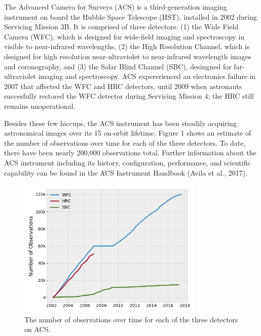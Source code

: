 \documentclass[10pt,journal,compsoc]{IEEEtran}
\begin{document}
The Advanced Camera for Surveys (ACS) is a third-generation imaging
instrument on board the Hubble Space Telescope (HST), installed in 2002 during
Servicing Mission 3B. It is comprised of three detectors: (1) the Wide Field Camera
(WFC), which is designed for wide-field imaging and spectroscopy in visible to
near-infrared wavelengths, (2) the High Resolution Channel, which is designed for
high resolution near-ultraviolet to near-infrared wavelength images and coronography,
and (3) the Solar Blind Channel (SBC), desingned for far-ultraviolet imaging and
spectroscopy.  ACS expererienced an electronics failure in 2007 that affected
the WFC and HRC detectors, until 2009 when astronauts succesfully restored the WFC
detector during Servicing Mission 4; the HRC still remains unoperational.

Besides these few hiccups, the ACS instrument has been steadily acquiring astronomical
images over its 15 on-orbit lifetime.  Figure 1 shows an estimate of the number of
observations over time for each of the three detectors.  To date, there have been
nearly 200,000 observations total.  Further information about the ACS instrument
including its history, configuration, performance, and scientific capability can be
found in the ACS Instrument Handbook (Avila et al., 2017).

\begin{figure}[!t]
\centering
\includegraphics[width=3.5in]{./figures/num_obs.png}
\caption{The number of observations over time for each of the three detectors on ACS.}
\label{fig1}
\end{figure}
\end{document}
